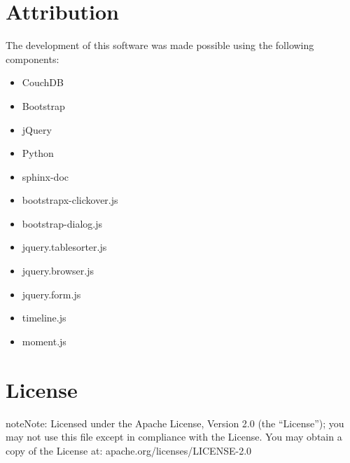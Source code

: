 \documentclass[letterpaper,10pt,english]{sphinxmanual}
\begin{document}
\chapter{Attribution}
\label{Attribution:attribution}\label{Attribution::doc}
The development of this software was made possible using the following components:
\begin{itemize}
\item {} 
CouchDB

\item {} 
Bootstrap

\item {} 
jQuery

\item {} 
Python

\item {} 
sphinx-doc

\item {} 
bootstrapx-clickover.js

\item {} 
bootstrap-dialog.js

\item {} 
jquery.tablesorter.js

\item {} 
jquery.browser.js

\item {} 
jquery.form.js

\item {} 
timeline.js

\item {} 
moment.js

\end{itemize}


\chapter{License}
\label{License::doc}\label{License:license}
\begin{notice}{note}{Note:}
Licensed under the Apache License, Version 2.0 (the ``License''); you may
not use this file except in compliance with the License. You may obtain
a copy of the License at: apache.org/licenses/LICENSE-2.0
\end{notice}



\renewcommand{\indexname}{Index}
\printindex
\end{document}
